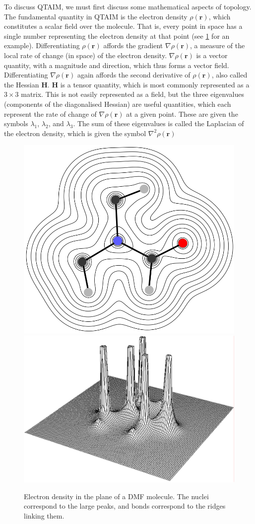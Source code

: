 \begin{refsection}
To discuss QTAIM, we must first discuss some mathematical aspects of topology.
The fundamental quantity in QTAIM is the electron density $\rho(\textbf{r})$, which constitutes a scalar field over the molecule.
That is, every point in space has a single number representing the electron density at that point (see \cref{fig:dmf-rho} for an example).
Differentiating $\rho(\textbf{r})$ affords the gradient $\nabla\rho(\textbf{r})$, a measure of the local rate of change (in space) of the electron density.
$\nabla\rho(\textbf{r})$ is a vector quantity, with a magnitude and direction, which thus forms a vector field.
Differentiating $\nabla\rho(\textbf{r})$ again affords the second derivative of $\rho(\textbf{r})$, also called the Hessian $\mathbf{H}$.
$\mathbf{H}$ is a tensor quantity, which is most commonly represented as a $3\times3$ matrix.
This is not easily represented as a field, but the three eigenvalues (components of the diagonalised Hessian) are useful quantities, which each represent the rate of change of $\nabla\rho(\textbf{r})$ at a given point. 
These are given the symbols $\lambda_1$, $\lambda_2$, and $\lambda_3$.
The sum of these eigenvalues is called the Laplacian of the electron density, which is given the symbol $\nabla^{2}\rho(\textbf{r})$

\begin{figure}
    \centering
    \includegraphics[width=0.48\linewidth]{Figures/dmf-dens-contour.pdf}
    \includegraphics[width=0.48\linewidth]{Figures/dmf-dens-relief.pdf}
    \caption[Electron density $\rho(\textbf{r})$ in the plane of a DMF molecule.]{Electron density in the plane of a DMF molecule. The nuclei correspond to the large peaks, and bonds correspond to the ridges linking them.}
    \label{fig:dmf-rho}
\end{figure}


\end{refsection}
